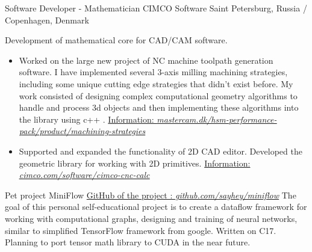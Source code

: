 \documentclass[11pt,a4paper]{moderncv}
\newcommand\Cpp{C\nolinebreak[4]\hspace{-.05em}\raisebox{.4ex}{\relsize{-3}{\textbf{++}}}}
\begin{document}
{Software Developer - Mathematician}
{\newline CIMCO Software}
{\newline Saint Petersburg, Russia / Copenhagen, Denmark}
{}{Development of mathematical core for CAD/CAM software.\newline{}
\begin{itemize}
\item Worked on the large new project of NC machine toolpath generation software.
      I have implemented several 3-axis milling machining strategies, including 
      some unique cutting edge strategies that didn't exist before. My work consisted of designing complex computational geometry algorithms to handle and process 3d objects and
      then implementing these algorithms into the library using c++ .\newline
      \href{http://www.mastercam.dk/hsm-performance-pack/product/machining-strategies}
      {Information: \underline{\emph{\textcolor[rgb]{0.00,0.00,0.50}{mastercam.dk/hsm-performance-pack/product/machining-strategies}}}}
\item Supported and expanded the functionality of 2D CAD editor. Developed the geometric 
      library for working with 2D primitives.\newline
      \href{http://www.cimco.com/software/cimco-cnc-calc}
      {Information: \underline{\emph{\textcolor[rgb]{0.00,0.00,0.50}{cimco.com/software/cimco-cnc-calc}}}}
\end{itemize}}

\vspace{20 pt}

{Pet project}
{\newline MiniFlow}
{}
{\newline \href{https://github.com/SayHey/MiniFlow}
               {GitHub of the project : \underline{\emph{\textcolor[rgb]{0.00,0.00,0.50}{github.com/sayhey/miniflow}}}}}
{The goal of this personal self-educational project is to create a dataflow framework for working with computational graphs, designing and training of neural networks, similar to simplified TensorFlow framework from google. Written on \Cpp17. Planning to port tensor math library to CUDA in the near future.}

\newpage
\end{document}
